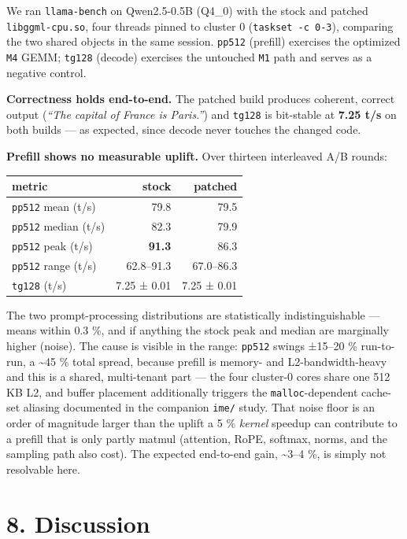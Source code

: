 \documentclass[
]{article}
\newcounter{none} %
\begin{document}
We ran \texttt{llama-bench} on Qwen2.5-0.5B (Q4\_0) with the stock and
patched \texttt{libggml-cpu.so}, four threads pinned to cluster 0
(\texttt{taskset\ -c\ 0-3}), comparing the two shared objects in the
same session. \texttt{pp512} (prefill) exercises the optimized
\texttt{M4} GEMM; \texttt{tg128} (decode) exercises the untouched
\texttt{M1} path and serves as a negative control.

\textbf{Correctness holds end-to-end.} The patched build produces
coherent, correct output (\emph{``The capital of France is Paris.''})
and \texttt{tg128} is bit-stable at \textbf{7.25 t/s} on both builds ---
as expected, since decode never touches the changed code.

\textbf{Prefill shows no measurable uplift.} Over thirteen interleaved
A/B rounds:

{\def\LTcaptype{none} %
\begin{longtable}[]{@{}lrr@{}}
\toprule\noalign{}
metric & stock & patched \\
\midrule\noalign{}
\endhead
\bottomrule\noalign{}
\endlastfoot
\texttt{pp512} mean (t/s) & 79.8 & 79.5 \\
\texttt{pp512} median (t/s) & 82.3 & 79.9 \\
\texttt{pp512} peak (t/s) & \textbf{91.3} & 86.3 \\
\texttt{pp512} range (t/s) & 62.8--91.3 & 67.0--86.3 \\
\texttt{tg128} (t/s) & 7.25 ± 0.01 & 7.25 ± 0.01 \\
\end{longtable}
}

The two prompt-processing distributions are statistically
indistinguishable --- means within 0.3 \%, and if anything the stock
peak and median are marginally higher (noise). The cause is visible in
the range: \texttt{pp512} swings ±15--20 \% run-to-run, a
\textasciitilde45 \% total spread, because prefill is memory- and
L2-bandwidth-heavy and this is a shared, multi-tenant part --- the four
cluster-0 cores share one 512 KB L2, and buffer placement additionally
triggers the \texttt{malloc}-dependent cache-set aliasing documented in
the companion \texttt{ime/} study. That noise floor is an order of
magnitude larger than the uplift a 5 \% \emph{kernel} speedup can
contribute to a prefill that is only partly matmul (attention, RoPE,
softmax, norms, and the sampling path also cost). The expected
end-to-end gain, \textasciitilde3--4 \%, is simply not resolvable here.

\section{8. Discussion}\label{discussion}
\end{document}
